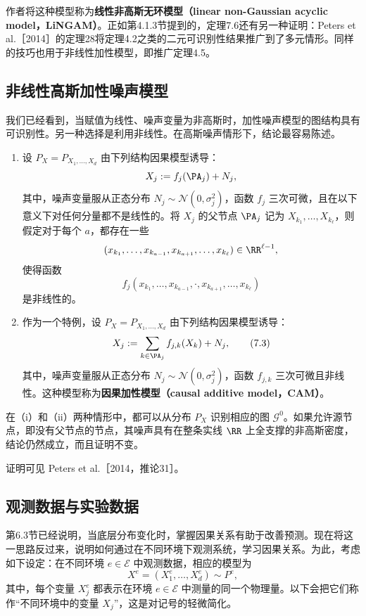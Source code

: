 作者将这种模型称为\textbf{线性非高斯无环模型（linear non-Gaussian acyclic model，LiNGAM）}。正如第4.1.3节提到的，定理7.6还有另一种证明：Peters et al.［2014］的定理28将定理4.2之类的二元可识别性结果推广到了多元情形。同样的技巧也用于非线性加性模型，即推广定理4.5。

\subsection{非线性高斯加性噪声模型}

我们已经看到，当赋值为线性、噪声变量为非高斯时，加性噪声模型的图结构具有可识别性。另一种选择是利用非线性。在高斯噪声情形下，结论最容易陈述。

\begin{theorem}[非线性高斯加性噪声模型的可识别性]
\begin{enumerate}[label=(\roman*)]
 \item 设 $P_X=P_{X_1,\ldots,X_d}$ 由下列结构因果模型诱导：
 \[
  X_j:=f_j(\PA_j)+N_j,
 \]
 其中，噪声变量服从正态分布 $N_j\sim\mathcal N(0,\sigma_j^2)$，函数 $f_j$ 三次可微，且在以下意义下对任何分量都不是线性的。将 $X_j$ 的父节点 $\PA_j$ 记为 $X_{k_1},\ldots,X_{k_\ell}$，则假定对于每个 $a$，都存在一些
 \[
  (x_{k_1},\ldots,x_{k_{a-1}},x_{k_{a+1}},\ldots,x_{k_\ell})
  \in\RR^{\ell-1},
 \]
 使得函数
 \[
  f_j(x_{k_1},\ldots,x_{k_{a-1}},\cdot,
      x_{k_{a+1}},\ldots,x_{k_\ell})
 \]
 是非线性的。
 \item 作为一个特例，设 $P_X=P_{X_1,\ldots,X_d}$ 由下列结构因果模型诱导：
 \begin{equation}
  X_j:=\sum_{k\in\PA_j}f_{j,k}(X_k)+N_j,
  \tag{7.3}
 \end{equation}
 其中，噪声变量服从正态分布 $N_j\sim\mathcal N(0,\sigma_j^2)$，函数 $f_{j,k}$ 三次可微且非线性。这种模型称为\textbf{因果加性模型（causal additive model，CAM）}。
\end{enumerate}
在（i）和（ii）两种情形中，都可以从分布 $P_X$ 识别相应的图 $\mathcal G^0$。如果允许源节点，即没有父节点的节点，其噪声具有在整条实线 $\RR$ 上全支撑的非高斯密度，结论仍然成立，而且证明不变。
\end{theorem}

证明可见 Peters et al.［2014，推论31］。

\subsection{观测数据与实验数据}

第6.3节已经说明，当底层分布变化时，掌握因果关系有助于改善预测。现在将这一思路反过来，说明如何通过在不同环境下观测系统，学习因果关系。为此，考虑如下设定：在不同环境 $e\in\mathcal E$ 中观测数据，相应的模型为
\[
 X^e=(X_1^e,\ldots,X_d^e)\sim P^e,
\]
其中，每个变量 $X_j^e$ 都表示在环境 $e\in\mathcal E$ 中测量的同一个物理量。以下会把它们称作“不同环境中的变量 $X_j$”，这是对记号的轻微简化。

